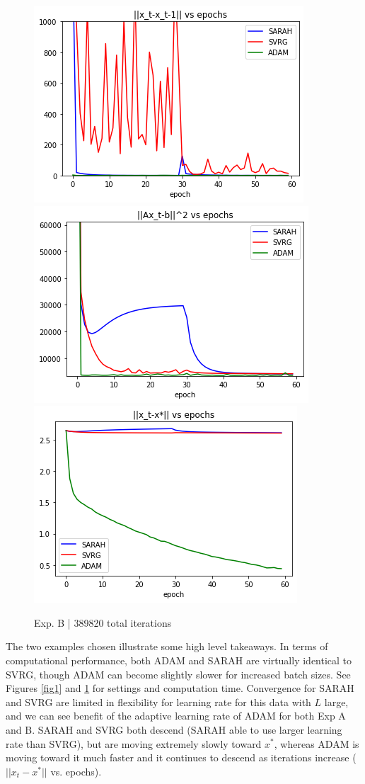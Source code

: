 \documentclass[letterpaper,11 pt]{article}
\begin{document}
\begin{figure}[htb]
\begin{centering}
\centering
\includegraphics[width=0.32\linewidth]{images/B1}
\includegraphics[width=0.32\linewidth]{images/B2} 
\includegraphics[width=0.32\linewidth]{images/B3}
\end{centering}
\begin{centering}
\centering
\end{centering}
\caption{Exp. B | 389820 total iterations}
\label{fig2}
\end{figure}

The two examples chosen illustrate some high level takeaways. In terms of computational performance, both ADAM and SARAH are virtually identical to SVRG, though ADAM can become slightly slower for increased batch sizes. See Figures \ref{fig1} and \ref{fig2} for settings and computation time. Convergence for SARAH and SVRG are limited in flexibility for learning rate for this data with $L$ large, and we can see benefit of the adaptive learning rate of ADAM for both Exp A and B.  SARAH and SVRG both descend (SARAH able to use larger learning rate than SVRG), but are moving extremely slowly toward $x^*$, whereas ADAM is moving toward it much faster and it continues to descend as iterations increase ($||x_t-x^*||$ vs. epochs).
\end{document}
